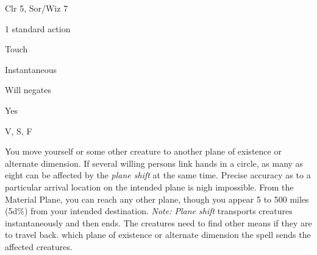 
\begin{description*}
\item[Level:] Clr 5, Sor/Wiz 7
\item[Casting Time:] 1 standard action
\item[Range:] Touch
\item[Duration:] Instantaneous
\item[Saving Throw:] Will negates
\item[Spell Resistance:] Yes
\item[Components:] V, S, F
\end{description*}

You move yourself or some other creature to another plane of existence or alternate
dimension. If several willing persons link hands in a circle, as many as eight
can be affected by the \textit{plane shift} at the same time. Precise accuracy
as to a particular arrival location on the intended plane is nigh impossible. From
the Material Plane, you can reach any other plane, though you appear 5 to 500 miles
(5d\%) from your intended destination.
\textit{Note: Plane shift} transports creatures instantaneously and then ends.
The creatures need to find other means if they are to travel back.
which plane of existence or alternate dimension the spell sends the affected creatures.